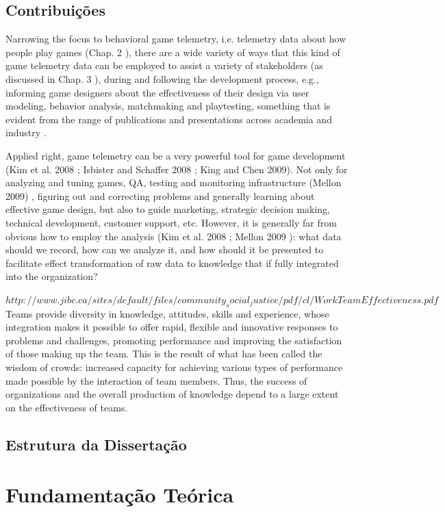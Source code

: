 \section{Contribuições}

Narrowing the focus to behavioral game telemetry, i.e. telemetry data about how people play games (Chap. 2 ), there are a wide variety of ways that this kind of game telemetry data can be employed to assist a variety of stakeholders (as discussed in Chap. 3 ), during and following the development process, e.g., informing game designers about the effectiveness of their design via user modeling, behavior analysis, matchmaking and playtesting, something that is evident from the range of publications and presentations across academia and industry \cite{el2016game}.


Applied right, game telemetry can be a very powerful tool for game development (Kim et al. 2008 ; Isbister and Schaffer 2008 ; King and Chen 2009). Not only for analyzing and tuning games, QA, testing and monitoring infrastructure (Mellon 2009) , figuring out and correcting problems and generally learning about effective game design, but also to guide marketing, strategic decision making, technical development, customer support, etc. However, it is generally far from obvious how to employ the analysis (Kim et al. 2008 ; Mellon 2009 ): what data should we record, how can we analyze it, and how should it be presented to facilitate effect transformation of raw data to knowledge that if fully integrated into the organization?


$http://www.jibc.ca/sites/default/files/community_social_justice/pdf/cl/Work Team Effectiveness.pdf $
Teams provide diversity in knowledge, attitudes, skills and experience, whose integration makes it possible to offer rapid, flexible and innovative responses to problems and challenges, promoting performance and improving the satisfaction of those making up the team. This is the result of what has been called the wisdom of crowds: increased capacity for achieving various types of performance made possible by the interaction of team members. Thus, the success of organizations and the overall production of knowledge depend to a large extent on the effectiveness of teams.

\section{Estrutura da Dissertação}

\chapter{Fundamentação Teórica}

